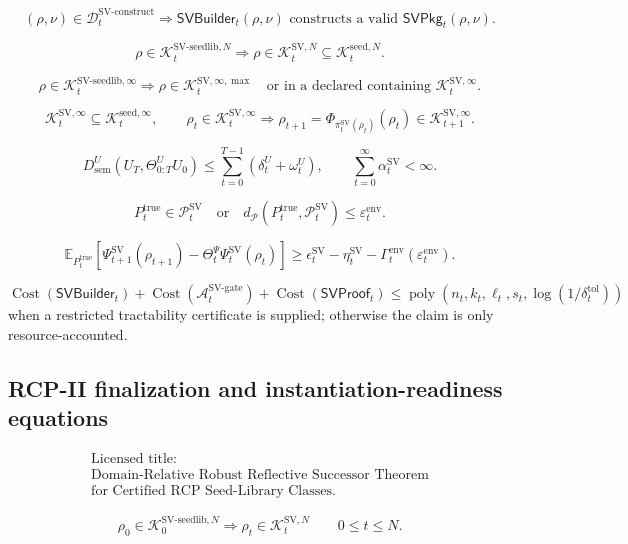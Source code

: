\documentclass[11pt]{article}
\newcommand{\Acal}{\mathcal{A}}
\newcommand{\Pcal}{\mathcal{P}}
\newcommand{\1}{\mathbf{1}}
\providecommand{\Dcal}{\mathcal{D}}
\providecommand{\Kcal}{\mathcal{K}}
\providecommand{\true}{\mathrm{true}}
\providecommand{\sem}{\mathrm{sem}}
\providecommand{\Cost}{\operatorname{Cost}}
\begin{document}
\[
(\rho,\nu)\in\Dcal_t^{\mathrm{SV\mbox{-}construct}}
\Longrightarrow
\mathsf{SVBuilder}_t(\rho,\nu)\text{ constructs a valid }\mathsf{SVPkg}_t(\rho,\nu).
\]

\[
\rho\in\Kcal_t^{\mathrm{SV\mbox{-}seedlib},N}
\Longrightarrow
\rho\in\Kcal_t^{\mathrm{SV},N}
\subseteq
\Kcal_t^{\mathrm{seed},N}.
\]

\[
\rho\in\Kcal_t^{\mathrm{SV\mbox{-}seedlib},\infty}
\Longrightarrow
\rho\in\Kcal_t^{\mathrm{SV},\infty,\max}
\quad\text{or in a declared containing }\Kcal_t^{\mathrm{SV},\infty}.
\]

\[
\Kcal_t^{\mathrm{SV},\infty}\subseteq\Kcal_t^{\mathrm{seed},\infty},
\qquad
\rho_t\in\Kcal_t^{\mathrm{SV},\infty}
\Longrightarrow
\rho_{t+1}=\Phi_{\pi_t^{\mathrm{SV}}(\rho_t)}(\rho_t)\in\Kcal_{t+1}^{\mathrm{SV},\infty}.
\]

\[
D_{\sem}^U(U_T,\Theta_{0:T}^UU_0)
\le
\sum_{t=0}^{T-1}(\delta_t^U+\omega_t^U),
\qquad
\sum_{t=0}^{\infty}\alpha_t^{\mathrm{SV}}<\infty.
\]

\[
P_t^{\true}\in\Pcal_t^{\mathrm{SV}}
\quad\text{or}\quad
d_{\Pcal}(P_t^{\true},\Pcal_t^{\mathrm{SV}})\le\varepsilon_t^{\mathrm{env}}.
\]

\[
\mathbb E_{P_t^{\true}}
\left[
\Psi_{t+1}^{\mathrm{SV}}(\rho_{t+1})-
\Theta_t^{\Psi}\Psi_t^{\mathrm{SV}}(\rho_t)
\right]
\ge
\epsilon_t^{\mathrm{SV}}-
\eta_t^{\mathrm{SV}}-
\Gamma_t^{\mathrm{env}}(\varepsilon_t^{\mathrm{env}}).
\]

\[
\Cost(\mathsf{SVBuilder}_t)+\Cost(\Acal_t^{\mathrm{SV\mbox{-}gate}})+\Cost(\mathsf{SVProof}_t)
\le
\operatorname{poly}(n_t,k_t,\ell_t,s_t,\log(1/\delta_t^{\mathrm{tol}}))
\]
when a restricted tractability certificate is supplied; otherwise the claim is only resource-accounted.


\subsection{RCP-II finalization and instantiation-readiness equations}

\[
\begin{gathered}
\text{Licensed title:}\\
\text{Domain-Relative Robust Reflective Successor Theorem}\\
\text{for Certified RCP Seed-Library Classes.}
\end{gathered}
\]

\[
\rho_0\in\Kcal_0^{\mathrm{SV\mbox{-}seedlib},N}
\Longrightarrow
\rho_t\in\Kcal_t^{\mathrm{SV},N}
\qquad 0\le t\le N.
\]
\end{document}
